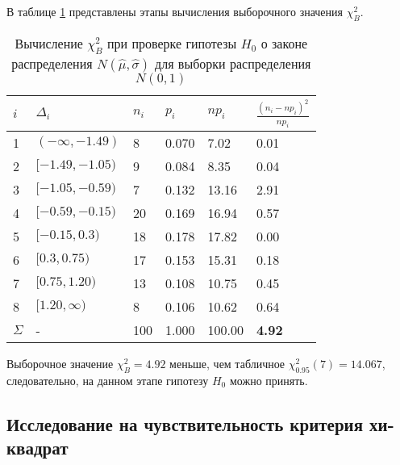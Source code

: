 \documentclass[12pt]{article}
\begin{document}
	В таблице \ref{N(m, s)} представлены этапы вычисления выборочного значения  $\chi_{B}^2$.
	

		\begin{table}[H]
		\begin{center}
			\begin{tabular}{|l|l|l|l|l|l|}
			\hline
			$i$      & $\Delta_i$             & $n_i$ & $p_i$ & $n p_i$ & $\frac{(n_i - np_i)^2}{np_i}$ \\ \hline
			1        & $(-\infty, -1.49)$ & 8   & 0.070 & 7.02   & 0.01                        \\ \hline
			2        & $[-1.49, -1.05)$   & 9   & 0.084 & 8.35   & 0.04                          \\ \hline
			3        & $[-1.05, -0.59)$   & 7   & 0.132 & 13.16  & 2.91                         \\ \hline
			4        & $[-0.59, -0.15)$   & 20  & 0.169 & 16.94  & 0.57                        \\ \hline
			5        & $[-0.15, 0.3)$     & 18  & 0.178 & 17.82  & 0.00                     \\ \hline
			6        & $[0.3, 0.75)$      & 17  & 0.153 & 15.31  & 0.18                     \\ \hline
			7        & $[0.75, 1.20)$    & 13  & 0.108 & 10.75  & 0.45                         \\ \hline
			8       & $[1.20, \infty)$   & 8   & 0.106 & 10.62  & 0.64                  \\ \hline
			$\Sigma$ & -                      & 100   & 1.000  & 100.00   & {\bf 4.92}   \\  \hline                    
		\end{tabular}
		\end{center}
	\caption{Вычисление $\chi_{B}^2$ при проверке гипотезы $H_0$ о законе распределения $N(\hat{\mu}, \hat{\sigma})$ для выборки распределения $N(0, 1)$} \label{N(m, s)}
	\end{table}

	
	
	Выборочное значение $\chi_{B}^2 = 4.92$ меньше, чем табличное   $\chi_{0.95}^2(7)=14.067$, следовательно, на данном этапе гипотезу $H_0$ можно принять.
	

\newpage 
\subsection{Исследование на чувствительность критерия хи-квадрат}
\end{document}
